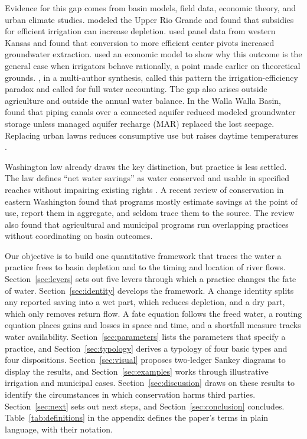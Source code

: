 \documentclass[11pt]{article}
\begin{document}
Evidence for this gap comes from basin models, field data, economic theory, and urban climate studies. \citet{ward2008} modeled the Upper Rio Grande and found that subsidies for efficient irrigation can increase depletion. \citet{pfeiffer2014} used panel data from western Kansas and found that conversion to more efficient center pivots increased groundwater extraction. \citet{contor2013} used an economic model to show why this outcome is the general case when irrigators behave rationally, a point \citet{huffaker2003} made earlier on theoretical grounds. \citet{grafton2018}, in a multi-author synthesis, called this pattern the irrigation-efficiency paradox and called for full water accounting. The gap also arises outside agriculture and outside the annual water balance. In the Walla Walla Basin, \citet{scherberg2018} found that piping canals over a connected aquifer reduced modeled groundwater storage unless managed aquifer recharge (MAR) replaced the lost seepage. Replacing urban lawns reduces consumptive use but raises daytime temperatures \citep{vahmani2016,saher2022}.

Washington law already draws the key distinction, but practice is less settled. The law defines ``net water savings'' as water conserved and usable in specified reaches without impairing existing rights \citep{rcw9042020}. A recent review of conservation in eastern Washington \citep{wadraft2026} found that programs mostly estimate savings at the point of use, report them in aggregate, and seldom trace them to the source. The review also found that agricultural and municipal programs run overlapping practices without coordinating on basin outcomes.

Our objective is to build one quantitative framework that traces the water a practice frees to basin depletion and to the timing and location of river flows. Section~\ref{sec:levers} sets out five levers through which a practice changes the fate of water. Section~\ref{sec:identity} develops the framework. A change identity splits any reported saving into a wet part, which reduces depletion, and a dry part, which only removes return flow. A fate equation follows the freed water, a routing equation places gains and losses in space and time, and a shortfall measure tracks water availability. Section~\ref{sec:parameters} lists the parameters that specify a practice, and Section~\ref{sec:typology} derives a typology of four basic types and four dispositions. Section~\ref{sec:visual} proposes two-ledger Sankey diagrams to display the results, and Section~\ref{sec:examples} works through illustrative irrigation and municipal cases. Section~\ref{sec:discussion} draws on these results to identify the circumstances in which conservation harms third parties. Section~\ref{sec:next} sets out next steps, and Section~\ref{sec:conclusion} concludes. Table~\ref{tab:definitions} in the appendix defines the paper's terms in plain language, with their notation.
\end{document}
